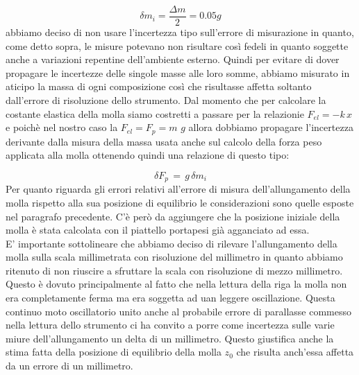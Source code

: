 \begin{equation*}
	\delta m_i = \frac{\Delta m}{2} = 0.05 g 
\end{equation*}
%
abbiamo deciso di non usare l'incertezza tipo sull'errore di misurazione in quanto, come detto sopra, le misure potevano non risultare così fedeli in quanto soggette anche a variazioni repentine dell'ambiente esterno.
Quindi per evitare di dover propagare le incertezze delle singole masse alle loro somme, abbiamo misurato in aticipo la massa di ogni composizione così che risultasse affetta soltanto dall'errore di risoluzione dello strumento.
Dal momento che per calcolare la costante elastica della molla siamo costretti a passare per la relazionie $F_{el} = -k\,x$ e poichè nel nostro caso la $F_{el} = F_{p} = m\,\,g$ allora dobbiamo propagare l'incertezza derivante dalla misura della massa usata anche sul calcolo della forza peso applicata alla molla ottenendo quindi una relazione di questo tipo:

\begin{equation*}
	\delta F_{p}\, =\, g\,\delta m_i
\end{equation*}
%
Per quanto riguarda gli errori relativi all'errore di misura dell'allungamento della molla rispetto alla sua posizione di equilibrio le considerazioni sono quelle esposte nel paragrafo precedente. C'è però da aggiungere che la posizione iniziale della molla è stata calcolata con il piattello portapesi già agganciato ad essa.\\
E' importante sottolineare che abbiamo deciso di rilevare l'allungamento della molla sulla scala millimetrata con risoluzione del millimetro in quanto abbiamo ritenuto di non riuscire a sfruttare la scala con risoluzione di mezzo millimetro. Questo è dovuto principalmente al fatto che nella lettura della riga la molla non era completamente ferma ma era soggetta ad uan leggere oscillazione. Questa continuo moto oscillatorio unito anche al probabile errore di parallasse commesso nella lettura dello strumento ci ha convito a porre come incertezza sulle varie miure dell'allungamento un delta di un millimetro. Questo giustifica anche la stima fatta della posizione di equilibrio della molla $z_0$ che risulta anch'essa affetta da un errore di un millimetro.

